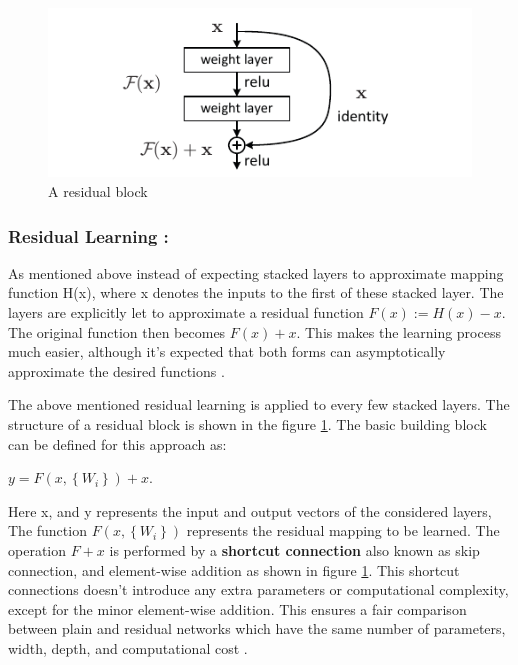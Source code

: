 \begin{figure}[ht!]
    \centering
    \includegraphics[width=1.2\linewidth]{Rohit_Master_Thesis//Images/residual_block.pdf}
    \caption{A residual block \cite{he2016deep}}
    \label{fig:residual block}
\end{figure}

\subsubsection*{Residual Learning :}

As mentioned above instead of expecting stacked layers to approximate mapping function H(x), where x denotes the inputs to the first of these stacked layer. The layers are explicitly let to approximate a residual function $F(x) := H(x) - x$. The original function then becomes $F(x) + x$. This makes the learning process much easier, although it's expected that both forms can asymptotically approximate the desired functions \cite{he2016deep}.

The above mentioned residual learning is applied to every few stacked layers. The structure of a residual block is shown in the figure \ref{fig:residual block}. The basic building block can be defined for this approach as:

$ y = F(x, \left\{ W_{i}\right\}) + x$.

Here x, and y represents the input and output vectors of the considered layers, The function $F(x, \left\{ W_{i}\right\})$  represents the residual mapping to be learned. The operation $F + x$ is performed by a \textbf{shortcut connection} also known as skip connection, and element-wise addition as shown in figure \ref{fig:residual block}. This shortcut connections doesn't introduce any extra parameters or computational complexity, except for the minor element-wise addition. This ensures a fair comparison between plain and residual networks  which have the same number of parameters, width, depth, and computational cost \cite{he2016deep}.

